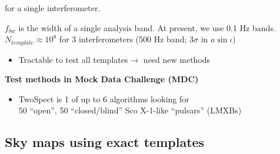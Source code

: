 \noindent for a single interferometer. 

$f_{bw}$ is the width of a single analysis band. At present, we use 0.1 Hz bands.
$N_{template}\approx10^{8}$ for 3 interferometers (500 Hz band; $3\sigma$
in $a\sin\iota$)$ $
\begin{itemize}
\item Tractable to test all templates$\rightarrow$ need new methods
\end{itemize}

\textbf{Test methods in Mock Data Challenge (MDC)}
\begin{itemize}
\item TwoSpect is 1 of up to 6 algorithms looking for \\
50 ``open'', 50 ``closed/blind'' Sco X-1-like ``pulsars'' (LMXBs)
\end{itemize}

\subsection{Sky maps using exact templates}


